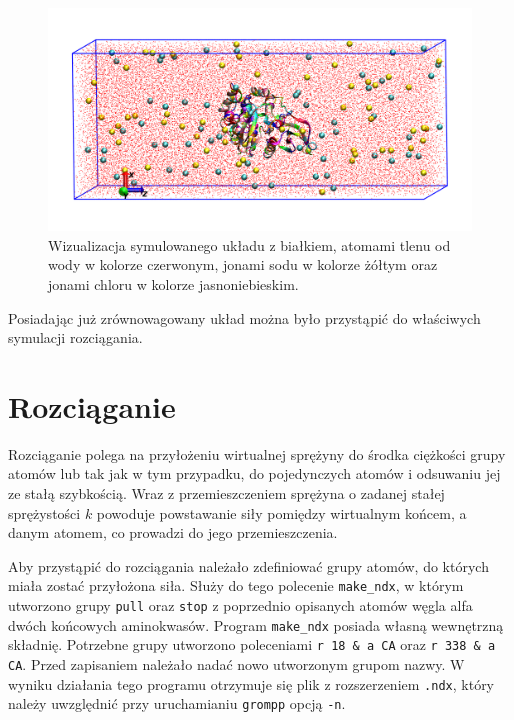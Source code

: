 \begin{figure}[h]
\begin{centering}
\includegraphics[width=150mm]{./rys/plot.png}
\caption{Wizualizacja symulowanego układu z białkiem, atomami tlenu od wody w kolorze czerwonym, jonami sodu w kolorze żółtym oraz jonami chloru w kolorze jasnoniebieskim.}
\end{centering}
\end{figure}

Posiadając już zrównowagowany układ można było przystąpić do właściwych symulacji rozciągania.

\section{Rozciąganie}

Rozciąganie polega na przyłożeniu wirtualnej sprężyny do środka ciężkości grupy atomów lub tak jak w tym przypadku, do pojedynczych atomów i odsuwaniu jej ze stałą szybkością. Wraz z przemieszczeniem sprężyna o zadanej stałej sprężystości $k$ powoduje powstawanie siły pomiędzy wirtualnym końcem, a danym atomem, co prowadzi do jego przemieszczenia.

Aby przystąpić do rozciągania należało zdefiniować grupy atomów, do których miała zostać przyłożona siła. Służy do tego polecenie \texttt{make\_ndx}, w którym utworzono grupy \texttt{pull} oraz \texttt{stop} z poprzednio opisanych atomów węgla alfa dwóch końcowych aminokwasów. Program \texttt{make\_ndx} posiada własną wewnętrzną składnię. Potrzebne grupy utworzono poleceniami \texttt{r 18 \& a CA} oraz \texttt{r 338 \& a CA}. Przed zapisaniem należało nadać nowo utworzonym grupom nazwy. W wyniku działania tego programu otrzymuje się plik z rozszerzeniem \texttt{.ndx}, który należy uwzględnić przy uruchamianiu \texttt{grompp} opcją \texttt{-n}.

